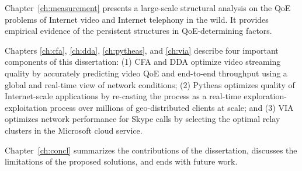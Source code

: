 Chapter~\ref{ch:measurement} presents a large-scale structural analysis
on the QoE problems of Internet video and Internet telephony in the wild.
It provides empirical evidence of the persistent structures in QoE-determining
factors. 

Chapters \ref{ch:cfa}, \ref{ch:dda}, \ref{ch:pytheas}, and \ref{ch:via} 
describe four important components of this dissertation: 
(1) CFA and DDA optimize video streaming quality by accurately predicting 
video QoE and end-to-end throughput using a global and real-time view of 
network conditions;
(2) Pytheas optimizes quality of Internet-scale applications by re-casting
the \ddn process as a real-time exploration-exploitation process 
over millions of geo-distributed clients at scale; and
(3) VIA optimizes network performance for Skype calls by selecting
the optimal relay clusters in the Microsoft cloud service.

Chapter~\ref{ch:concl} summarizes the contributions of the dissertation, 
discusses the limitations of the proposed solutions, and ends with future 
work.










